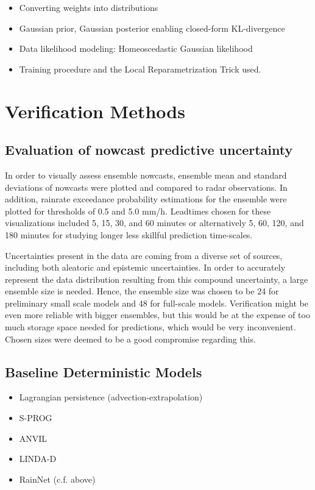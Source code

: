 \begin{itemize}
	\item Converting weights into distributions
	\item Gaussian prior, Gaussian posterior enabling closed-form KL-divergence
	\item Data likelihood modeling: Homeoscedastic Gaussian likelihood
	\item Training procedure and the Local Reparametrization Trick used. 

\end{itemize}

\section{Verification Methods}

\subsection{Evaluation of nowcast predictive uncertainty}


In order to visually assess ensemble nowcasts, ensemble mean and standard deviations of nowcasts were plotted and compared to radar observations. In addition, rainrate exceedance probability estimations for the ensemble were plotted for thresholds of 0.5 and 5.0 mm/h. Leadtimes chosen for these visualizations included 5, 15, 30, and 60 minutes or alternatively 5, 60, 120, and 180 minutes for studying longer less skillful prediction time-scales.

Uncertainties present in the data are coming from a diverse set of sources, including both aleatoric and epistemic uncertainties. In order to accurately represent the data distribution resulting from this compound uncertainty, a large ensemble size is needed. Hence, the ensemble size was chosen to be 24 for preliminary small scale models and 48 for full-scale models. Verification might be even more reliable with bigger ensembles, but this would be at the expense of too much storage space needed for predictions, which would be very inconvenient. Chosen sizes were deemed to be a good compromise regarding this.



\subsection{Baseline Deterministic Models}
\begin{itemize}
	\item Lagrangian persistence (advection-extrapolation)
	\item S-PROG
	\item ANVIL
	\item LINDA-D
	\item RainNet (c.f. above)
\end{itemize}


